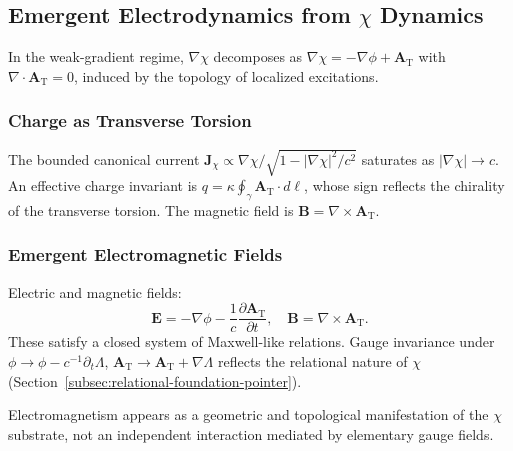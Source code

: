 \subsection{Emergent Electrodynamics from
\texorpdfstring{$\chi$}{χ} Dynamics}
\label{app:emergent-electrodynamics}

In the weak-gradient regime, $\nabla\chi$ decomposes as
$\nabla\chi = -\nabla\phi + \mathbf{A}_\mathrm{T}$ with
$\nabla \cdot \mathbf{A}_\mathrm{T} = 0$, induced by the topology of
localized excitations.

\subsubsection*{Charge as Transverse Torsion}
\label{subsec:charge-as-torsion}

The bounded canonical current
$\mathbf{J}_\chi
  \propto \nabla\chi/\sqrt{1 - |\nabla\chi|^2/c^2}$
saturates as $|\nabla\chi| \to c$.
An effective charge invariant is
$q = \kappa \oint_\gamma
    \mathbf{A}_\mathrm{T} \cdot d\boldsymbol{\ell}$,
whose sign reflects the chirality of the transverse torsion.
The magnetic field is
$\mathbf{B} = \nabla \times \mathbf{A}_\mathrm{T}$.

\subsubsection*{Emergent Electromagnetic Fields}

Electric and magnetic fields:
\[
  \mathbf{E}
  = -\nabla\phi
    - \frac{1}{c}\frac{\partial\mathbf{A}_\mathrm{T}}
                      {\partial t},
  \quad
  \mathbf{B}
  = \nabla \times \mathbf{A}_\mathrm{T}.
\]
These satisfy a closed system of Maxwell-like relations.
Gauge invariance under
$\phi \to \phi - c^{-1}\partial_t\Lambda$,
$\mathbf{A}_\mathrm{T}
  \to \mathbf{A}_\mathrm{T} + \nabla\Lambda$
reflects the relational nature of $\chi$
(Section~\ref{subsec:relational-foundation-pointer}).

Electromagnetism appears as a geometric and topological manifestation
of the $\chi$ substrate, not an independent interaction mediated by
elementary gauge fields.
